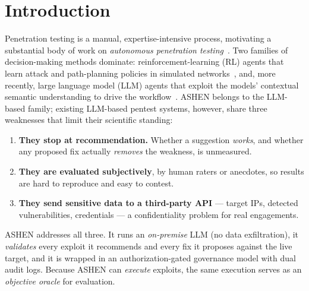 \documentclass[conference]{IEEEtran}
\begin{document}
\section{Introduction}
Penetration testing is a manual, expertise-intensive process, motivating a
substantial body of work on \emph{autonomous penetration testing}~\cite{rlreview}.
Two families of decision-making methods dominate: reinforcement-learning (RL)
agents that learn attack and path-planning policies in simulated
networks~\cite{rlreview,autoptsim}, and, more recently, large language model (LLM)
agents that exploit the models' contextual semantic understanding to drive the
workflow~\cite{pentestgpt,hacksynth}. ASHEN belongs to the LLM-based family;
existing LLM-based pentest systems, however, share three weaknesses that limit
their scientific standing:
\begin{enumerate}
\item \textbf{They stop at recommendation.} Whether a suggestion \emph{works},
and whether any proposed fix actually \emph{removes} the weakness, is unmeasured.
\item \textbf{They are evaluated subjectively}, by human raters or anecdotes, so
results are hard to reproduce and easy to contest.
\item \textbf{They send sensitive data to a third-party API} --- target IPs,
detected vulnerabilities, credentials --- a confidentiality problem for real
engagements.
\end{enumerate}

ASHEN addresses all three. It runs an \emph{on-premise} LLM (no data
exfiltration), it \emph{validates} every exploit it recommends and every fix it
proposes against the live target, and it is wrapped in an authorization-gated
governance model with dual audit logs. Because ASHEN can \emph{execute} exploits,
the same execution serves as an \emph{objective oracle} for evaluation.
\end{document}
